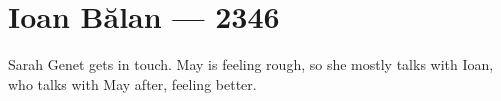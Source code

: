 \hypertarget{ioan-bux103lan-2346}{%
\chapter{Ioan Bălan — 2346}\label{ioan-bux103lan-2346}}

Sarah Genet gets in touch. May is feeling rough, so she mostly talks with Ioan, who talks with May after, feeling better.
